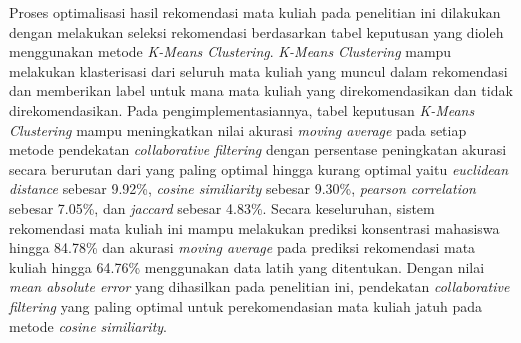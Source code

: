 Proses optimalisasi hasil rekomendasi mata kuliah pada penelitian ini dilakukan dengan melakukan seleksi rekomendasi berdasarkan tabel keputusan
yang dioleh menggunakan metode \emph{K-Means Clustering}. \emph{K-Means Clustering} mampu melakukan klasterisasi dari seluruh mata kuliah yang muncul dalam rekomendasi
dan memberikan label untuk mana mata kuliah yang direkomendasikan dan tidak direkomendasikan. Pada pengimplementasiannya, tabel keputusan \emph{K-Means Clustering}
mampu meningkatkan nilai akurasi \emph{moving average} pada setiap metode pendekatan \emph{collaborative filtering} dengan persentase peningkatan akurasi secara berurutan
dari yang paling optimal hingga kurang optimal yaitu \emph{euclidean distance} sebesar 9.92\%, \emph{cosine similiarity} sebesar 9.30\%, \emph{pearson correlation} sebesar 7.05\%,
dan \emph{jaccard} sebesar 4.83\%. Secara keseluruhan, sistem rekomendasi mata kuliah ini mampu melakukan prediksi konsentrasi mahasiswa hingga 84.78\% dan akurasi
\emph{moving average} pada prediksi rekomendasi mata kuliah hingga 64.76\% menggunakan data latih yang ditentukan. Dengan nilai \emph{mean absolute error} yang dihasilkan
pada penelitian ini, pendekatan \emph{collaborative filtering} yang paling optimal untuk perekomendasian mata kuliah jatuh pada metode \emph{cosine similiarity}.

